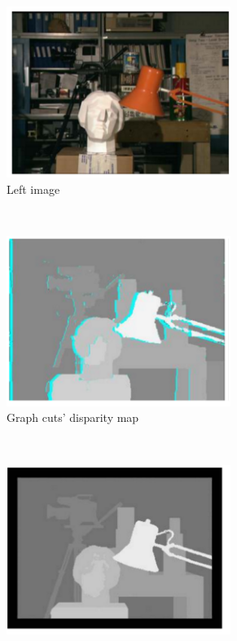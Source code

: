 \begin{figure}[h!]
\centering
\begin{subfigure}[]{0.4\textwidth}
\centering
\includegraphics[width=0.8\textwidth]{./img/gf1.png}
\caption{\scriptsize{Left image}}
\end{subfigure}%
~ %
\begin{subfigure}[]{0.4\textwidth}
\centering
\includegraphics[width=0.8\textwidth]{./img/gf2.png}
\caption{\scriptsize{Graph cuts' disparity map}}
\end{subfigure} 
~\quad
\begin{subfigure}[]{0.4\textwidth}
\centering
\includegraphics[width=0.8\textwidth]{./img/gf3.png}

\end{subfigure}
\end{figure}

